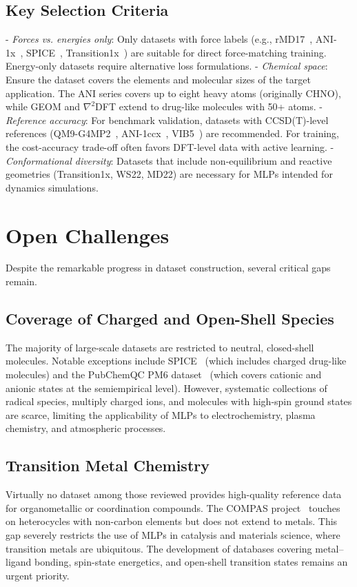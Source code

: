 \documentclass[12pt]{article}
\begin{document}
\subsection*{Key Selection Criteria}
- \textit{Forces vs. energies only}: Only datasets with force labels (e.g., rMD17~\cite{ds20-19}, ANI-1x~\cite{ds26-3}, SPICE~\cite{ds12-43}, Transition1x~\cite{ds28-47}) are suitable for direct force-matching training. Energy-only datasets require alternative loss formulations.
- \textit{Chemical space}: Ensure the dataset covers the elements and molecular sizes of the target application. The ANI series covers up to eight heavy atoms (originally CHNO), while GEOM and $\nabla^2$DFT extend to drug-like molecules with 50+ atoms.
- \textit{Reference accuracy}: For benchmark validation, datasets with CCSD(T)-level references (QM9-G4MP2~\cite{ds2-36}, ANI-1ccx~\cite{ds26-3}, VIB5~\cite{ds24-48}) are recommended. For training, the cost-accuracy trade-off often favors DFT-level data with active learning.
- \textit{Conformational diversity}: Datasets that include non-equilibrium and reactive geometries (Transition1x, WS22, MD22) are necessary for MLPs intended for dynamics simulations.

\section{Open Challenges}

Despite the remarkable progress in dataset construction, several critical gaps remain.

\subsection*{Coverage of Charged and Open-Shell Species}
The majority of large-scale datasets are restricted to neutral, closed-shell molecules. Notable exceptions include SPICE~\cite{ds12-43} (which includes charged drug-like molecules) and the PubChemQC PM6 dataset~\cite{ds14-29} (which covers cationic and anionic states at the semiempirical level). However, systematic collections of radical species, multiply charged ions, and molecules with high-spin ground states are scarce, limiting the applicability of MLPs to electrochemistry, plasma chemistry, and atmospheric processes.

\subsection*{Transition Metal Chemistry}
Virtually no dataset among those reviewed provides high-quality reference data for organometallic or coordination compounds. The COMPAS project~\cite{ds32-12} touches on heterocycles with non-carbon elements but does not extend to metals. This gap severely restricts the use of MLPs in catalysis and materials science, where transition metals are ubiquitous. The development of databases covering metal–ligand bonding, spin-state energetics, and open-shell transition states remains an urgent priority.
\end{document}
